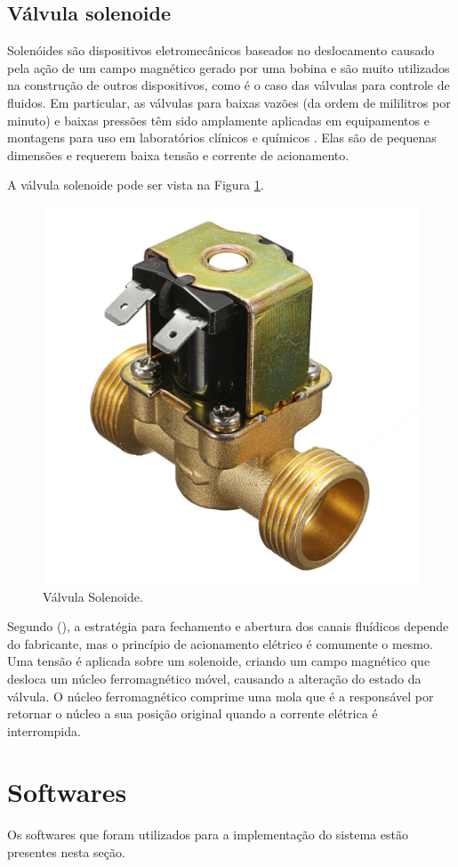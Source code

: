 \newpage

\subsection{Válvula solenoide} \label{sec:valvula}

Solenóides são dispositivos eletromecânicos baseados no deslocamento causado pela ação de um campo magnético gerado por uma bobina e são muito utilizados na construção de outros dispositivos, como é o caso das válvulas para controle de fluidos. Em particular, as válvulas para baixas vazões (da ordem de mililitros por minuto) e baixas pressões têm sido amplamente aplicadas em equipamentos e montagens para uso em laboratórios clínicos e químicos  \cite{da2002modulo}. Elas são de pequenas dimensões e requerem baixa tensão e corrente de acionamento.

A válvula solenoide pode ser vista na Figura \ref{fig:valvula-solenoide}.

\begin{figure}[htbp]
	\centering
	\includegraphics[width=0.3\linewidth]{figuras/valvula-solenoide.jpg}
	\caption{Válvula Solenoide.}
	\label{fig:valvula-solenoide}
\end{figure}

Segundo \citeauthor{da2002modulo} (\citeyear{da2002modulo}), a estratégia para fechamento e abertura dos canais fluídicos depende do fabricante, mas o princípio de acionamento elétrico é comumente o mesmo. Uma tensão é aplicada sobre um solenoide, criando um campo magnético que desloca um núcleo ferromagnético móvel, causando a alteração do estado da válvula. O núcleo
ferromagnético comprime uma mola que é a responsável por retornar o núcleo a sua posição original quando a corrente elétrica é interrompida.

\section{Softwares}

Os softwares que foram utilizados para a implementação do sistema estão presentes nesta seção.

